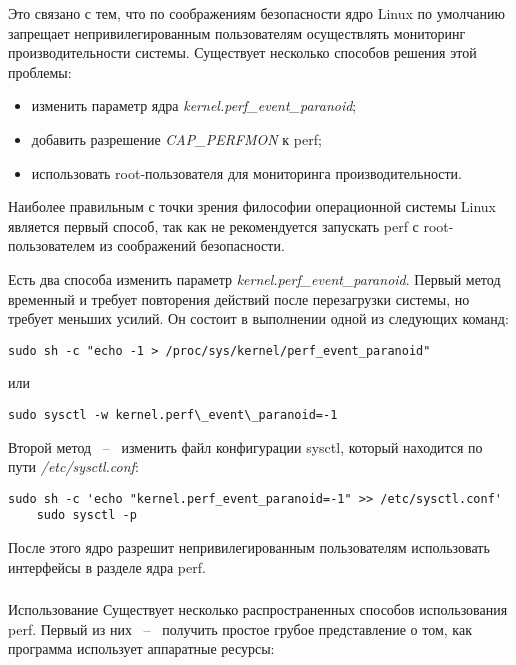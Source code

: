 Это связано с тем, что по соображениям безопасности ядро Linux по умолчанию запрещает непривилегированным пользователям 
осуществлять мониторинг производительности системы. Существует несколько способов решения этой проблемы:

\begin{itemize}
    \item изменить параметр ядра \textit{kernel.perf\_event\_paranoid};
    \item добавить разрешение \textit{CAP\_PERFMON} к perf;
    \item использовать root-пользователя для мониторинга производительности.
\end{itemize}

Наиболее правильным с точки зрения философии операционной системы Linux является первый способ, 
так как не рекомендуется запускать perf с root-пользователем из соображений безопасности.

Есть два способа изменить параметр \textit{kernel.perf\_event\_paranoid}.
Первый метод временный и требует повторения действий после перезагрузки системы, но требует меньших усилий.
Он состоит в выполнении одной из следующих команд:

\begin{lstlisting}[style=CodeListing]
    sudo sh -c "echo -1 > /proc/sys/kernel/perf_event_paranoid"
\end{lstlisting}

или

\begin{lstlisting}[style=CodeListing]
    sudo sysctl -w kernel.perf\_event\_paranoid=-1
\end{lstlisting}

Второй метод ~--~ изменить файл конфигурации sysctl, который находится по пути \textit{/etc/sysctl.conf}:

\begin{lstlisting}[style=CodeListing]
    sudo sh -c 'echo "kernel.perf_event_paranoid=-1" >> /etc/sysctl.conf'
    sudo sysctl -p
\end{lstlisting}

После этого ядро разрешит непривилегированным пользователям использовать интерфейсы в разделе ядра perf.

\subsubsection{} Использование
Существует несколько распространенных способов использования perf. 
Первый из них ~--~ получить простое грубое представление о том, как программа использует аппаратные ресурсы:

